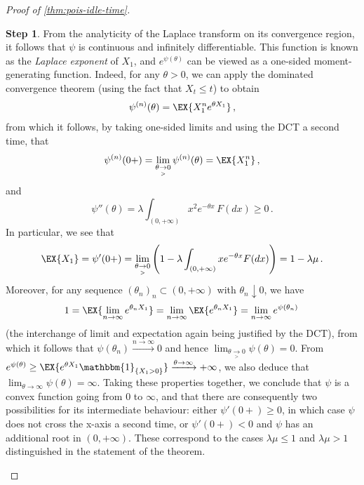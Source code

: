 \documentclass[titlepage]{article}
\theoremstyle{plain}
\theoremstyle{definition}
\newtheorem{proofpart}{Step}
\begin{document}
\begin{proof}[Proof of \cref{thm:pois-idle-time}]
\begin{proofpart}
    From the analyticity of the Laplace transform on its convergence region, it follows that $\psi$ is continuous and infinitely differentiable. This function is known as the \emph{Laplace exponent} of $X_1$, and $e^{\psi(\theta)}$ can be viewed as a one-sided moment-generating function. Indeed, for any $\theta > 0$, we can apply the dominated convergence theorem (using the fact that $X_t \leq t$) to obtain
    \begin{align}
      \psi^{(n)}(\theta) = \EX{X_1^n e^{\theta X_1}} \,,
    \end{align}
    from which it follows, by taking one-sided limits and using the DCT a second time, that
    \begin{equation} \label{eq:first-moment}
      \psi^{(n)}(0+) = \lim_{\theta \underset{>}{\to} 0} \psi^{(n)}(\theta) = \EX{X_1^n} \,,
    \end{equation}
    and
    \begin{equation}
      \psi''(\theta) = \lambda \int_{(0, +\infty)} x^2 e^{-\theta x} \, F(dx) \geq 0 \,.
    \end{equation}
    In particular, we see that
    \begin{equation} \label{eq:right-deriv}
      \EX{X_1} = \psi'(0+) = \lim_{\theta \underset{>}{\to} 0} \left( 1 - \lambda \int_{(0, +\infty)} x e^{-\theta x} F(dx) \right) = 1 - \lambda \mu \,.
    \end{equation}
    Moreover, for any sequence $(\theta_n)_n \subset (0, +\infty)$ with $\theta_n \downarrow 0$, we have
    \begin{equation}
      1 = \EX{\lim_{n \to \infty} e^{\theta_n X_1}} = \lim_{n \to \infty} \EX{e^{\theta_n X_1}} = \lim_{n \to \infty} e^{\psi(\theta_n)} \,
    \end{equation}
    (the interchange of limit and expectation again being justified by the DCT), from which it follows that $\psi(\theta_n) \xrightarrow{n \to \infty} 0$ and hence $\lim_{\theta \underset{>}{\to} 0} \psi(\theta) = 0$. From $e^{\psi(\theta)} \geq \EX{e^{\theta X_1} \mathbbm{1}_{\{ X_1 > 0\}}} \xrightarrow{\theta \to \infty} +\infty$, we also deduce that $\lim_{\theta \to \infty} \psi(\theta) = \infty$. Taking these properties together, we conclude that $\psi$ is a convex function going from $0$ to $\infty$, and that there are consequently two possibilities for its intermediate behaviour: either $\psi'(0+) \geq 0$, in which case $\psi$ does not cross the x-axis a second time, or $\psi'(0+) < 0$ and $\psi$ has an additional root in $(0, +\infty)$. These correspond to the cases $\lambda \mu \leq 1$ and $\lambda \mu > 1$ distinguished in the statement of the theorem.
  \end{proofpart}


\end{proof}
\end{document}
